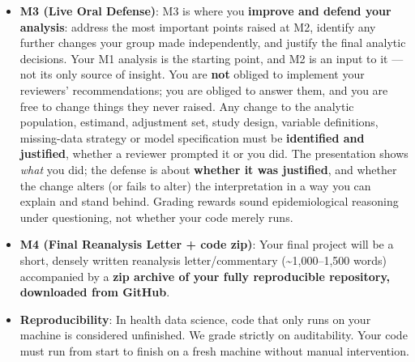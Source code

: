 \documentclass[
]{article}
\begin{document}
\begin{itemize}
  \textbf{(3) whether you agree with their choice of dominant threat}
  --- and if not, which threat you think dominates and why. You are not
  expected to have arrived knowing the clinical literature of a paper
  you did not choose, but you are expected to go and read enough of it
  to make the point you are making --- the paper's citations and the
  code in front of you are within reach. Put a point as a question only
  after you have looked and the answer is genuinely unsettled, and then
  say what you checked: ``the paper cites no source for this threshold''
  is a finding; ``we are not clinicians'' is not. A critique that finds
  little wrong is entirely acceptable when it is evidenced: a reviewer
  who recommends acceptance with reasons is doing the job. You are
  graded on the \textbf{quality of the critique} --- whether you
  identify real methodological weaknesses, express them professionally,
  and suggest a practical way forward --- never on how many faults you
  produce. You do \textbf{not} write code for the other group's paper
  and you do \textbf{not} implement anything on it; your recommendations
  are input that they must answer at M3.
\item
  \textbf{M3 (Live Oral Defense)}: M3 is where you \textbf{improve and
  defend your analysis}: address the most important points raised at M2,
  identify any further changes your group made independently, and
  justify the final analytic decisions. Your M1 analysis is the starting
  point, and M2 is an input to it --- not its only source of insight.
  You are \textbf{not} obliged to implement your reviewers'
  recommendations; you are obliged to answer them, and you are free to
  change things they never raised. Any change to the analytic
  population, estimand, adjustment set, study design, variable
  definitions, missing-data strategy or model specification must be
  \textbf{identified and justified}, whether a reviewer prompted it or
  you did. The presentation shows \emph{what} you did; the defense is
  about \textbf{whether it was justified}, and whether the change alters
  (or fails to alter) the interpretation in a way you can explain and
  stand behind. Grading rewards sound epidemiological reasoning under
  questioning, not whether your code merely runs.
\item
  \textbf{M4 (Final Reanalysis Letter + code zip)}: Your final project
  will be a short, densely written reanalysis letter/commentary
  (\textasciitilde1,000--1,500 words) accompanied by a \textbf{zip
  archive of your fully reproducible repository, downloaded from
  GitHub}.
\item
  \textbf{Reproducibility}: In health data science, code that only runs
  on your machine is considered unfinished. We grade strictly on
  auditability. Your code must run from start to finish on a fresh
  machine without manual intervention.
\end{itemize}
\end{document}
